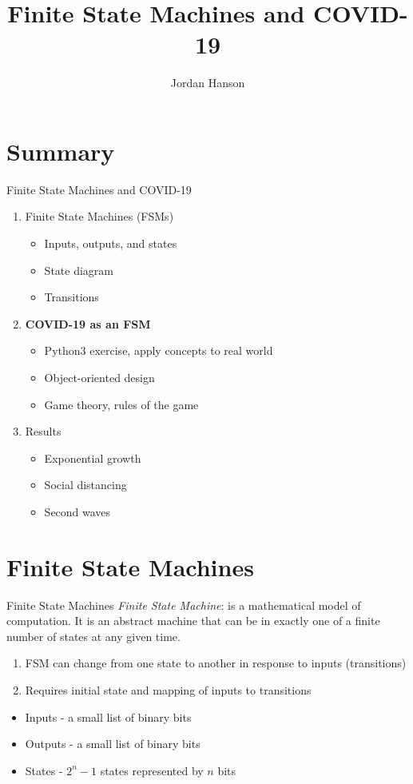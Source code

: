 \documentclass{beamer}
\title{Finite State Machines and COVID-19}
\author{Jordan Hanson}
\institute{Whittier College Department of Physics and Astronomy}
\begin{document}
\maketitle

\section{Summary}

\begin{frame}{Finite State Machines and COVID-19}
\begin{enumerate}
\item Finite State Machines (FSMs)
\begin{itemize}
\item Inputs, outputs, and states
\item State diagram
\item Transitions
\end{itemize}
\item \textbf{COVID-19 as an FSM}
\begin{itemize}
\item Python3 exercise, apply concepts to real world
\item Object-oriented design
\item Game theory, rules of the game
\end{itemize}
\item Results
\begin{itemize}
\item Exponential growth
\item Social distancing
\item \alert{Second waves}
\end{itemize}
\end{enumerate}
\end{frame}

\section{Finite State Machines}

\begin{frame}{Finite State Machines}
\textit{Finite State Machine}: is a mathematical model of computation. It is an abstract machine that can be in exactly one of a finite number of states at any given time.
\begin{enumerate}
\item FSM can change from one state to another in response to inputs (transitions)
\item Requires initial state and mapping of inputs to transitions
\end{enumerate}

\begin{itemize}
\item Inputs - a small list of binary bits
\item Outputs - a small list of binary bits
\item States - $2^n - 1$ states represented by $n$ bits
\end{itemize}
\end{frame}
\end{document}
